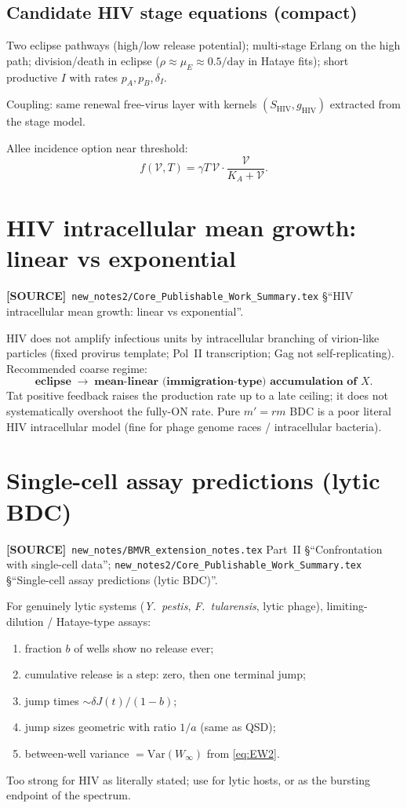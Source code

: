 \documentclass[11pt,a4paper]{article}
\newcommand{\Vfree}{\mathcal{V}}
\theoremstyle{plain}
\theoremstyle{definition}
\theoremstyle{remark}
\newcommand{\SOURCE}{\textcolor{gray!50!black}{\textbf{[SOURCE]}}}
\begin{document}
\subsection{Candidate HIV stage equations (compact)}

Two eclipse pathways (high/low release potential); multi-stage Erlang on the
high path; division/death in eclipse ($\rho\approx\mu_E\approx 0.5/\mathrm{day}$
in Hataye fits); short productive $I$ with rates $p_A,p_B,\delta_I$.

Coupling: same renewal free-virus layer with kernels
$(S_{\mathrm{HIV}},g_{\mathrm{HIV}})$ extracted from the stage model.

Allee incidence option near threshold:
\[
f(\Vfree,T)=\gamma T\,\Vfree\cdot\frac{\Vfree}{K_A+\Vfree}.
\]

\section{HIV intracellular mean growth: linear vs exponential}
\label{sec:hiv-growth}
\SOURCE\
\texttt{new\_notes2/Core\_Publishable\_Work\_Summary.tex}
\S``HIV intracellular mean growth: linear vs exponential''.

HIV does not amplify infectious units by intracellular branching of virion-like
particles (fixed provirus template; Pol~II transcription; Gag not self-replicating).
Recommended coarse regime:
\begin{equation}
\textbf{eclipse}\;\longrightarrow\;
\textbf{mean-linear (immigration-type) accumulation of }X.
\end{equation}
Tat positive feedback raises the production rate up to a late ceiling; it does
not systematically overshoot the fully-ON rate. Pure $m'=rm$ BDC is a poor
literal HIV intracellular model (fine for phage genome races / intracellular
bacteria).

\section{Single-cell assay predictions (lytic BDC)}
\label{sec:assay}
\SOURCE\
\texttt{new\_notes/BMVR\_extension\_notes.tex}
Part~II \S``Confrontation with single-cell data'';
\texttt{new\_notes2/Core\_Publishable\_Work\_Summary.tex}
\S``Single-cell assay predictions (lytic BDC)''.

For genuinely lytic systems (\textit{Y.~pestis}, \textit{F.~tularensis}, lytic phage),
limiting-dilution / Hataye-type assays:
\begin{enumerate}
\item fraction $b$ of wells show no release ever;
\item cumulative release is a step: zero, then one terminal jump;
\item jump times $\sim\delta J(t)/(1-b)$;
\item jump sizes geometric with ratio $1/a$ (same as QSD);
\item between-well variance $=\mathrm{Var}(W_\infty)$ from \eqref{eq:EW2}.
\end{enumerate}
Too strong for HIV as literally stated; use for lytic hosts, or as the bursting
endpoint of the spectrum.
\end{document}
